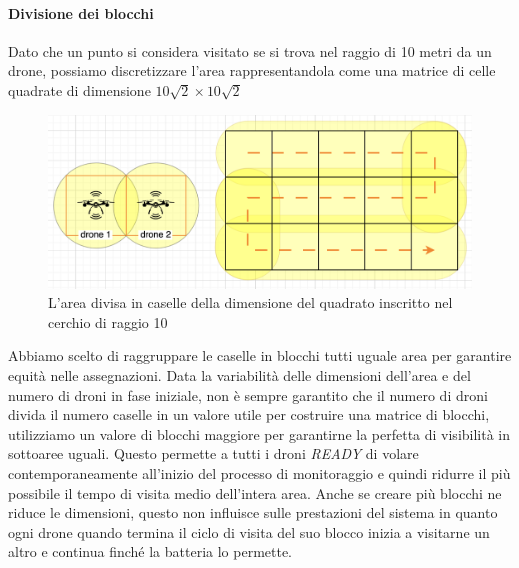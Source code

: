 \documentclass[a4paper, 11pt]{article}
\begin{document}
\paragraph*{Divisione dei blocchi}
Dato che un punto si considera visitato se si trova nel raggio di 10 metri da un drone, possiamo discretizzare l'area rappresentandola come una matrice di celle quadrate di dimensione $10\sqrt{2} \times 10\sqrt{2}$
\begin{figure}[h]
    \centering
    \includegraphics[height = 5 cm]{image/areedroni.png}
    \caption{L'area divisa in caselle della dimensione del quadrato inscritto nel cerchio di raggio 10}
\end{figure}

Abbiamo scelto di raggruppare le caselle in blocchi tutti uguale area per garantire equità nelle assegnazioni. 
Data la variabilità delle dimensioni dell'area e del numero di droni in fase iniziale, non è sempre garantito che il numero di droni divida il numero caselle in un valore utile per costruire una matrice di blocchi, utilizziamo un valore di blocchi maggiore per garantirne la perfetta di visibilità in sottoaree uguali.
Questo permette a tutti i droni \textit{READY} di volare contemporaneamente all'inizio del processo di monitoraggio e quindi ridurre il più possibile il tempo di visita medio dell'intera area.
Anche se creare più blocchi ne riduce le dimensioni, questo non influisce sulle prestazioni del sistema in quanto ogni drone quando termina il ciclo di visita del suo blocco inizia a visitarne un altro e continua finché la batteria lo permette.
\end{document}
